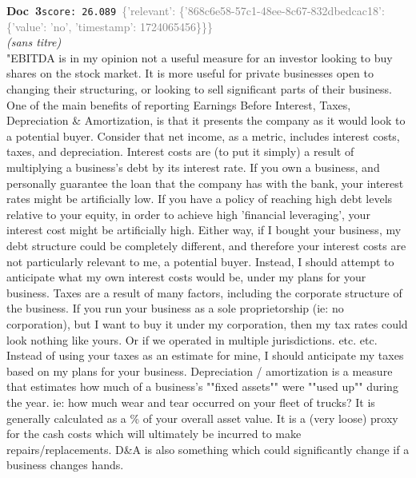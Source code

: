 \documentclass[a4paper,11pt]{article}
\begin{document}
\begin{docenv}
{\footnotesize\textcolor{doccolor}{\textbf{Doc~3}}}\hfill{\tiny\texttt{score:~26.089}}\ {\tiny\textcolor{gray}{\{'relevant': \{'868c6e58-57c1-48ee-8c67-832dbedcac18': \{'value': 'no', 'timestamp': 1724065456\}\}\}}}\\[3pt]
{\small\textit{(sans titre)}}\\[2pt]
\vspace{2pt}
{\footnotesize 
"EBITDA is in my opinion not a useful measure for an investor looking to buy shares on the stock market. It is more useful for private businesses open to changing their structuring, or looking to sell significant parts of their business. One of the main benefits of reporting Earnings Before Interest, Taxes, Depreciation \& Amortization, is that it presents the company as it would look to a potential buyer. Consider that net income, as a metric, includes interest costs, taxes, and depreciation. Interest costs are (to put it simply) a result of multiplying a business's debt by its interest rate. If you own a business, and personally guarantee the loan that the company has with the bank, your interest rates might be artificially low. If you have a policy of reaching high debt levels relative to your equity, in order to achieve high 'financial leveraging', your interest cost might be artificially high. Either way, if I bought your business, my debt structure could be completely different, and therefore your interest costs are not particularly relevant to me, a potential buyer. Instead, I should attempt to anticipate what my own interest costs would be, under my plans for your business. Taxes are a result of many factors, including the corporate structure of the business. If you run your business as a sole proprietorship (ie: no corporation), but I want to buy it under my corporation, then my tax rates could look nothing like yours. Or if we operated in multiple jurisdictions. etc. etc. Instead of using your taxes as an estimate for mine, I should anticipate my taxes based on my plans for your business. Depreciation / amortization is a measure that estimates how much of a business's ""fixed assets"" were ""used up"" during the year. ie: how much wear and tear occurred on your fleet of trucks? It is generally calculated as a \% of your overall asset value. It is a (very loose) proxy for the cash costs which will ultimately be incurred to make repairs/replacements. D\&A is also something which could significantly change if a business changes hands.}
\end{docenv}
\end{document}
